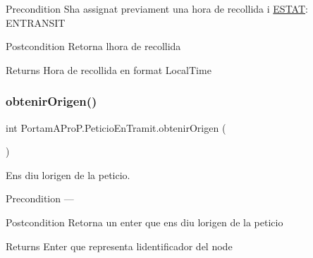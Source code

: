 \begin{DoxyPrecond}{Precondition}
S\textquotesingle{}ha assignat previament una hora de recollida i \hyperlink{enum_portam_a_pro_p_1_1_peticio_en_tramit_1_1_e_s_t_a_t}{E\+S\+T\+AT}\+: E\+N\+T\+R\+A\+N\+S\+IT 
\end{DoxyPrecond}
\begin{DoxyPostcond}{Postcondition}
Retorna l\textquotesingle{}hora de recollida 
\end{DoxyPostcond}
\begin{DoxyReturn}{Returns}
Hora de recollida en format Local\+Time 
\end{DoxyReturn}
\mbox{\label{class_portam_a_pro_p_1_1_peticio_en_tramit_ab789cc2fdc3c9244383e316b63d105b7}} 
\subsubsection{\texorpdfstring{obtenir\+Origen()}{obtenirOrigen()}}
{\footnotesize\ttfamily int Portam\+A\+Pro\+P.\+Peticio\+En\+Tramit.\+obtenir\+Origen (\begin{DoxyParamCaption}{ }\end{DoxyParamCaption})}



Ens diu l\textquotesingle{}origen de la peticio. 

\begin{DoxyPrecond}{Precondition}
--- 
\end{DoxyPrecond}
\begin{DoxyPostcond}{Postcondition}
Retorna un enter que ens diu l\textquotesingle{}origen de la peticio 
\end{DoxyPostcond}
\begin{DoxyReturn}{Returns}
Enter que representa l\textquotesingle{}identificador del node 
\end{DoxyReturn}
\mbox{\label{class_portam_a_pro_p_1_1_peticio_en_tramit_a3277b3163251c8862a89358055737189}} 
